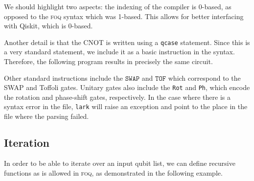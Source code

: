 \documentclass[a4paper,onecolumn,11pt,unpublished]{quantumarticle}
\newcommand{\foq}{\textnormal{\textsc{foq}}}
\newenvironment{PFOQprogram}{\ttfamily \begin{tabular}{l} }{\end{tabular}}
\begin{document}
We should highlight two aspects: the indexing of the compiler is 0-based, as opposed to the \foq{} syntax which was 1-based. This allows for better interfacing with Qiskit, which is 0-based.

Another detail is that the CNOT is written using a \texttt{qcase} statement. Since this is a very standard statement, we include it as a basic instruction in the syntax. Therefore, the following program results in precisely the same circuit.
\vspace{3mm}

\noindent
\begin{minipage}{0.5\textwidth}
\scalebox{0.9}{
\begin{PFOQprogram}
::\\
define q;\\
::\\
q[0] *= H;\\
CNOT(q[0],q[1]);
\end{PFOQprogram}}
\end{minipage}
\begin{minipage}{0.5\textwidth}
\begin{center}
\end{center}
\end{minipage}
\vspace{3mm}

Other standard instructions include the $\texttt{SWAP}$ and $\texttt{TOF}$ which correspond to the SWAP and Toffoli gates. Unitary gates also include the \texttt{Rot} and \texttt{Ph}, which encode the rotation and phase-shift gates, respectively.
%
In the case where there is a syntax error in the file, \texttt{lark} will raise an exception and point to the place in the file where the parsing failed.

\subsection{Iteration}

 In order to be able to iterate over an input qubit list, we can define recursive functions as is allowed in \foq{}, as demonstrated in the following example.
\vspace{3mm}
\end{document}
